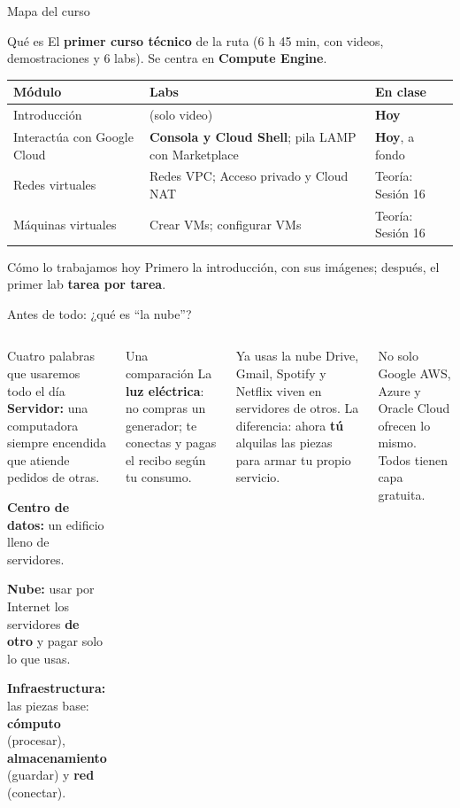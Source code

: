 \documentclass[aspectratio=169,10pt,c]{beamer}
\begin{document}
\begin{frame}{Mapa del curso}
\begin{block}{Qué es}
\small El \textbf{primer curso técnico} de la ruta (6 h 45 min, con videos, demostraciones y 6 labs). Se centra en \textbf{Compute Engine}.
\end{block}
\renewcommand{\arraystretch}{1.2}
\centering\small
\begin{tabular}{@{}p{4.2cm}>{\raggedright\arraybackslash}p{5.6cm}p{2.8cm}@{}}
\toprule
\textbf{Módulo} & \textbf{Labs} & \textbf{En clase}\\
\midrule
Introducción & (solo video) & \textbf{Hoy}\\
Interactúa con Google Cloud & \textbf{Consola y Cloud Shell}; pila LAMP con Marketplace & \textbf{Hoy}, a fondo\\
Redes virtuales & Redes VPC; Acceso privado y Cloud NAT & Teoría: Sesión 16\\
Máquinas virtuales & Crear VMs; configurar VMs & Teoría: Sesión 16\\
\bottomrule
\end{tabular}
\par\vspace{1mm}
\begin{alertblock}{Cómo lo trabajamos hoy}
\small Primero la introducción, con sus imágenes; después, el primer lab \textbf{tarea por tarea}.
\end{alertblock}
\end{frame}

\begin{frame}{Antes de todo: ¿qué es ``la nube''?}
\begin{columns}[T,onlytextwidth]
\begin{block}{Cuatro palabras que usaremos todo el día}
\small
\textbf{Servidor:} una computadora siempre encendida que atiende pedidos de otras.\par\smallskip
\textbf{Centro de datos:} un edificio lleno de servidores.\par\smallskip
\textbf{Nube:} usar por Internet los servidores \textbf{de otro} y pagar solo lo que usas.\par\smallskip
\textbf{Infraestructura:} las piezas base: \textbf{cómputo} (procesar), \textbf{almacenamiento} (guardar) y \textbf{red} (conectar).
\end{block}
\begin{exampleblock}{Una comparación}
\small La \textbf{luz eléctrica}: no compras un generador; te conectas y pagas el recibo según tu consumo.
\end{exampleblock}
\begin{block}{Ya usas la nube}
\small Drive, Gmail, Spotify y Netflix viven en servidores de otros. La diferencia: ahora \textbf{tú} alquilas las piezas para armar tu propio servicio.
\end{block}
\begin{alertblock}{No solo Google}
\small AWS, Azure y Oracle Cloud ofrecen lo mismo. Todos tienen capa gratuita.
\end{alertblock}
\end{columns}
\end{frame}
\end{document}
